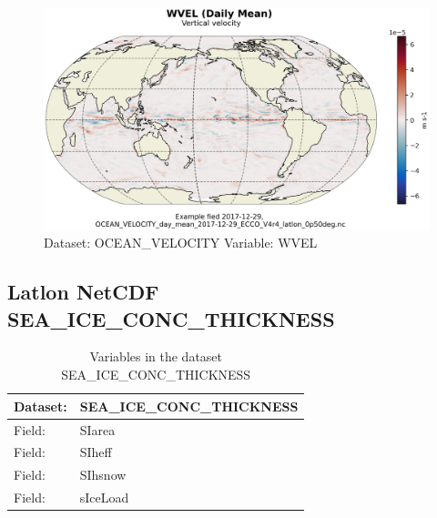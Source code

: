 \begin{figure}[H]
\centering
\includegraphics[scale=0.55]{../images/plots/latlon_plots/Ocean_Velocity/WVEL.png}
\caption{Dataset: OCEAN\_VELOCITY Variable: WVEL}
\label{tab:table-OCEAN_VELOCITY_WVEL-Plot}
\end{figure}
\pagebreak
\subsection{Latlon NetCDF SEA\_ICE\_CONC\_THICKNESS}
\newp
\begin{longtable}{|p{}|p{}|}
\caption{Variables in the dataset SEA\_ICE\_CONC\_THICKNESS}
\label{tab:table-SEA_ICE_CONC_THICKNESS-fields} \\ 
\hline \endhead \hline \endfoot
\rowcolor{lightgray} \textbf{Dataset:} & \textbf{SEA\_ICE\_CONC\_THICKNESS} \\ \hline
Field: &SIarea \\ \hline
Field: &SIheff \\ \hline
Field: &SIhsnow \\ \hline
Field: &sIceLoad \\ \hline
\end{longtable}

\pagebreak
